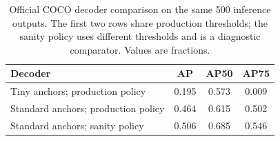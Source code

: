 \begin{table}[htbp]
\centering\small\TableSetup
\caption{Official COCO decoder comparison on the same 500 inference outputs. The first two rows share production thresholds; the sanity policy uses different thresholds and is a diagnostic comparator. Values are fractions.}
\label{tab:evaluation:yolov7_decoder_ab}
\begin{tabularx}{\linewidth}{@{}Y S[table-format=1.3] S[table-format=1.3] S[table-format=1.3]@{}}
\toprule
\textbf{Decoder} & {\textbf{AP}} & {\textbf{AP50}} & {\textbf{AP75}} \\
\midrule
Tiny anchors; production policy & 0.195 & 0.573 & 0.009 \\
Standard anchors; production policy & 0.464 & 0.615 & 0.502 \\
Standard anchors; sanity policy & 0.506 & 0.685 & 0.546 \\
\bottomrule
\end{tabularx}
\end{table}
